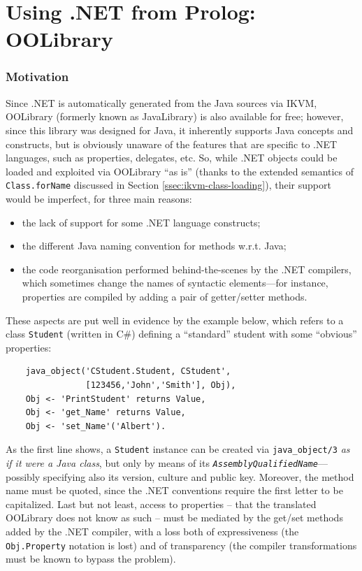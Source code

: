 \section{Using .NET from Prolog: OOLibrary}
\label{sec:dotnet-oolibrary}

\subsubsection{Motivation}

Since \tuprolog{}.NET is automatically generated from the Java sources via IKVM, OOLibrary (formerly known as JavaLibrary) is also available for free; however, since this library was designed for Java, it inherently supports Java concepts and constructs, but is obviously unaware of the features that are specific to .NET languages, such as properties, delegates, etc.
%
So, while .NET objects could be loaded and exploited via OOLibrary ``as is'' (thanks to the extended semantics of \texttt{Class.forName} discussed in Section \ref{ssec:ikvm-class-loading}), their support would be imperfect, for three main reasons:
\begin{itemize}
  \item the lack of support for some .NET language constructs;
  \item the different Java naming convention for methods w.r.t. Java;
  \item the code reorganisation performed behind-the-scenes by the .NET compilers, which sometimes change the names of syntactic elements---for instance, properties are compiled by adding a pair of getter/setter methods.
\end{itemize}

\noindent These aspects are put well in evidence by the example below, which refers to a class \texttt{Student} (written in C\#) defining a ``standard'' student with some ``obvious'' properties:

\begin{verbatim}
    java_object('CStudent.Student, CStudent',
                [123456,'John','Smith'], Obj),
    Obj <- 'PrintStudent' returns Value,
    Obj <- 'get_Name' returns Value,
    Obj <- 'set_Name'('Albert').
\end{verbatim}

\noindent As the first line shows, a \texttt{Student} instance can be created via \texttt{java\_object/3} \textit{as if it were a Java class}, but only by means of its \texttt{\textit{AssemblyQualifiedName}}---possibly specifying also its version, culture and public key.
Moreover, the method name must be quoted, since the .NET conventions require the first letter to be capitalized.
Last but not least, access to properties -- that the translated OOLibrary does not know  as such -- must be mediated by the get/set methods added by the .NET compiler, with a loss both of expressiveness (the \texttt{Obj.Property} notation is lost) and of transparency (the compiler transformations must be known to bypass the problem).

